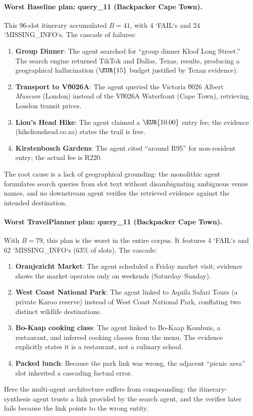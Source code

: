 \documentclass[a4paper,oneside,bibliography=totoc]{scrbook}
\begin{document}
\paragraph{Worst Baseline plan: query\_11 (Backpacker Cape Town).} This 96-slot itinerary accumulated $B = 41$, with 4 `FAIL`s and 24 `MISSING\_INFO`s. The cascade of failures:
\begin{enumerate}
    \item \textbf{Group Dinner}: The agent searched for ``group dinner Kloof Long Street.'' The search engine returned TikTok and Dallas, Texas, results, producing a geographical hallucination ($\EUR{15}$ budget justified by Texan evidence).
    \item \textbf{Transport to V\u0026A}: The agent queried the Victoria \u0026 Albert \emph{Museum} (London) instead of the V\u0026A Waterfront (Cape Town), retrieving London transit prices.
    \item \textbf{Lion's Head Hike}: The agent claimed a $\EUR{10.00}$ entry fee; the evidence (hikelionshead.co.za) states the trail is free.
    \item \textbf{Kirstenbosch Gardens}: The agent cited ``around R95'' for non-resident entry; the actual fee is R220.
\end{enumerate}
The root cause is a lack of geographical grounding: the monolithic agent formulates search queries from slot text without disambiguating ambiguous venue names, and no downstream agent verifies the retrieved evidence against the intended destination.

\paragraph{Worst TravelPlanner plan: query\_11 (Backpacker Cape Town).} With $B = 79$, this plan is the worst in the entire corpus. It features 4 `FAIL`s and 62 `MISSING\_INFO`s (63\% of slots). The cascade:
\begin{enumerate}
    \item \textbf{Oranjezicht Market}: The agent scheduled a Friday market visit; evidence shows the market operates only on weekends (Saturday--Sunday).
    \item \textbf{West Coast National Park}: The agent linked to Aquila Safari Tours (a private Karoo reserve) instead of West Coast National Park, conflating two distinct wildlife destinations.
    \item \textbf{Bo-Kaap cooking class}: The agent linked to Bo-Kaap Kombuis, a restaurant, and inferred cooking classes from the menu. The evidence explicitly states it is a restaurant, not a culinary school.
    \item \textbf{Packed lunch}: Because the park link was wrong, the adjacent ``picnic area'' slot inherited a cascading factual error.
\end{enumerate}
Here the multi-agent architecture suffers from compounding: the itinerary-synthesis agent trusts a link provided by the search agent, and the verifier later fails because the link points to the wrong entity.
\end{document}
